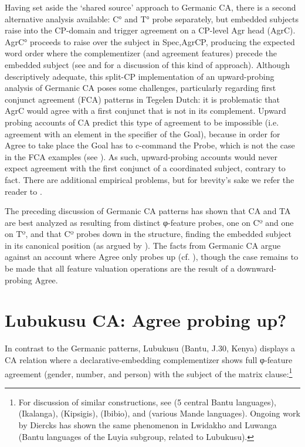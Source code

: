 \documentclass[output=paper
,modfonts
,nonflat
]{langsci/langscibook}
\begin{document}
Having set aside the `shared source' approach to Germanic CA, there is a second alternative analysis available: C° and T° probe separately, but embedded subjects raise into the CP-domain and trigger agreement on a CP-level Agr head (AgrC). AgrC° proceeds to raise over the subject in Spec,AgrCP, producing the expected word order where the complementizer (and agreement features) precede the embedded subject (see \citealt{Shlonsky:1994} and \citealt{Zwart:1993} for a discussion of this kind of approach). Although descriptively adequate, this split-CP implementation of an upward-probing analysis of Germanic CA poses some challenges, particularly regarding first conjunct agreement (FCA) patterns in Tegelen Dutch: it is problematic that AgrC would agree with a first conjunct that is not in its complement. Upward probing accounts of CA predict this type of agreement to be impossible (i.e. agreement with an element in the specifier of the Goal), because in order for Agree to take place the Goal has to c-command the Probe, which is not the case in the FCA examples (see \citealt{Baker:2008,Zeijlstra:2012,Wurmbrand:2011}). As such, upward-probing accounts would never expect agreement with the first conjunct of a coordinated subject, contrary to fact. There are additional empirical problems, but for brevity's sake we refer the reader to \citet{vanKoppen:2005,vanKoppen:2017}.

The preceding discussion of Germanic CA patterns has shown that CA and TA are best analyzed as resulting from distinct φ-feature probes, one on Cº and one on Tº, and that Cº probes down in the structure, finding the embedded subject in its canonical position (as argued by \citealt{Carstens:2003,vanKoppen:2005,Haegeman:2012}). The facts from Germanic CA argue against an account where Agree only probes up (cf. \citealt{Zeijlstra:2012,Wurmbrand:2011,Bjorkman:toappearb}), though the case remains to be made that all feature valuation operations are the result of a downward-probing Agree. 

\section{Lubukusu CA: Agree probing up?} \label{LubukusuCA}

In contrast to the Germanic patterns, Lubukusu (Bantu, J.30, Kenya) displays a CA relation where a declarative-embedding complementizer shows full φ-feature agreement (gender, number, and person) with the subject of the matrix clause:\footnote{For discussion of similar constructions, see \citet{Kawasha:2007} (5 central Bantu languages), \citet{LetsholoSafir:2017} (Ikalanga), \citet{DiercksRao:2017} (Kipsigis), \citet{Torrence:2016} (Ibibio), and \citet{Idiatov:2010} (various Mande languages). Ongoing work by Diercks has shown the same phenomenon in Lwidakho and Luwanga (Bantu languages of the Luyia subgroup, related to Lubukusu).}
\end{document}
